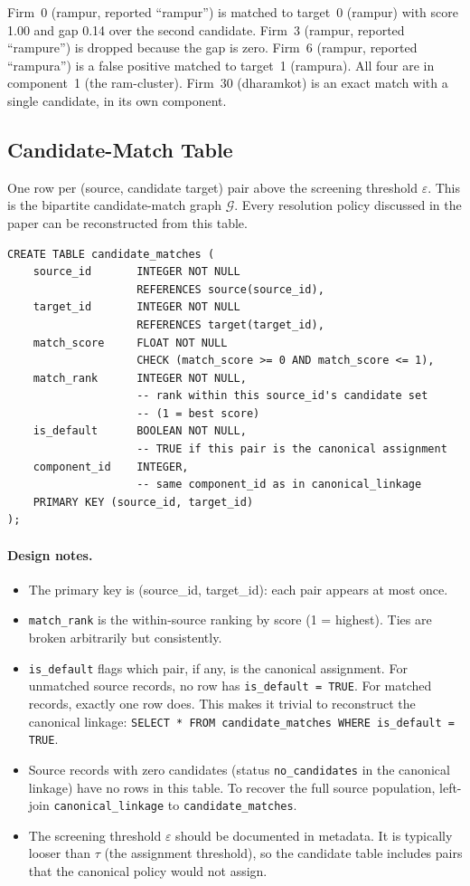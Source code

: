 \documentclass[12pt]{article}
\begin{document}
Firm~0 (rampur, reported ``rampur'') is matched to target~0 (rampur) with score 1.00 and gap 0.14 over the second candidate. Firm~3 (rampur, reported ``rampure'') is dropped because the gap is zero. Firm~6 (rampur, reported ``rampura'') is a false positive matched to target~1 (rampura). All four are in component~1 (the ram-cluster). Firm~30 (dharamkot) is an exact match with a single candidate, in its own component.

\subsection{Candidate-Match Table}

One row per (source, candidate target) pair above the screening threshold $\varepsilon$. This is the bipartite candidate-match graph $\mathcal{G}$. Every resolution policy discussed in the paper can be reconstructed from this table.

\begin{lstlisting}[style=sql]
CREATE TABLE candidate_matches (
    source_id       INTEGER NOT NULL
                    REFERENCES source(source_id),
    target_id       INTEGER NOT NULL
                    REFERENCES target(target_id),
    match_score     FLOAT NOT NULL
                    CHECK (match_score >= 0 AND match_score <= 1),
    match_rank      INTEGER NOT NULL,
                    -- rank within this source_id's candidate set
                    -- (1 = best score)
    is_default      BOOLEAN NOT NULL,
                    -- TRUE if this pair is the canonical assignment
    component_id    INTEGER,
                    -- same component_id as in canonical_linkage
    PRIMARY KEY (source_id, target_id)
);
\end{lstlisting}

\paragraph{Design notes.}
\begin{itemize}
    \item The primary key is (source\_id, target\_id): each pair appears at most once.
    \item \texttt{match\_rank} is the within-source ranking by score (1 = highest). Ties are broken arbitrarily but consistently.
    \item \texttt{is\_default} flags which pair, if any, is the canonical assignment. For unmatched source records, no row has \texttt{is\_default = TRUE}. For matched records, exactly one row does. This makes it trivial to reconstruct the canonical linkage: \texttt{SELECT * FROM candidate\_matches WHERE is\_default = TRUE}.
    \item Source records with zero candidates (status \texttt{no\_candidates} in the canonical linkage) have no rows in this table. To recover the full source population, left-join \texttt{canonical\_linkage} to \texttt{candidate\_matches}.
    \item The screening threshold $\varepsilon$ should be documented in metadata. It is typically looser than $\tau$ (the assignment threshold), so the candidate table includes pairs that the canonical policy would not assign.
\end{itemize}
\end{document}
